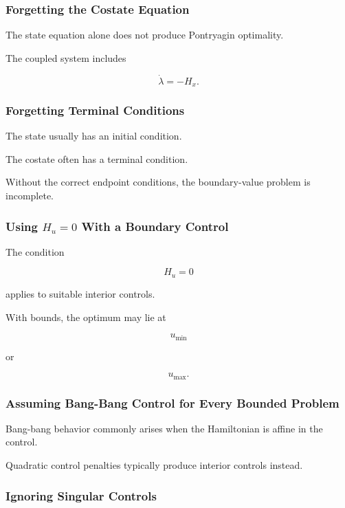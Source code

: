\subsubsection{Forgetting the Costate Equation}

The state equation alone does not produce Pontryagin optimality.

The coupled system includes

\[
\boxed{
\dot{\lambda}
=
-H_x.
}
\]

\subsubsection{Forgetting Terminal Conditions}

The state usually has an initial condition.

The costate often has a terminal condition.

Without the correct endpoint conditions, the boundary-value problem is
incomplete.

\subsubsection{Using \(H_u=0\) With a Boundary Control}

The condition

\[
H_u=0
\]

applies to suitable interior controls.

With bounds, the optimum may lie at

\[
u_{\min}
\]

or

\[
u_{\max}.
\]

\subsubsection{Assuming Bang-Bang Control for Every Bounded Problem}

Bang-bang behavior commonly arises when the Hamiltonian is affine in the
control.

Quadratic control penalties typically produce interior controls instead.

\subsubsection{Ignoring Singular Controls}

